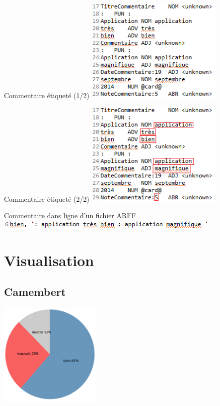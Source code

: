 \documentclass{beamer}
\begin{document}
\begin{frame}
	\begin{block}{Commentaire étiqueté (1/2)}
		\includegraphics[height=5cm]{imgs/arff1.png}
	\end{block}
\end{frame}

\begin{frame}
	\begin{block}{Commentaire étiqueté (2/2)}
		\includegraphics[height=5cm]{imgs/arff2.png}
	\end{block}
\end{frame}

\begin{frame}
	\begin{block}{Commentaire dans ligne d'un fichier ARFF}
		\includegraphics[width=\textwidth]{imgs/arff3.png}
	\end{block}
\end{frame}

\section{Visualisation}
\subsection{Camembert}
\begin{frame}
	\includegraphics[height=5cm]{imgs/visu1.png}
\end{frame}
\end{document}
